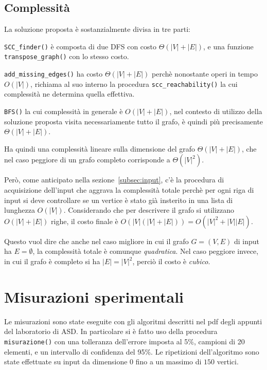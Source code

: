 \documentclass[a4paper,8pt]{article}
\theoremstyle{definition}
\theoremstyle{remark}
\begin{document}
\subsection{Complessità}
\label{subsec:complessita}
La soluzione proposta è sostanzialmente divisa in tre parti:

\medskip
\verb!SCC_finder()! è composta di due DFS con costo $\Theta(|V|+|E|)$, e una
funzione \verb!transpose_graph()! con lo stesso costo.

\smallskip
\verb!add_missing_edges()! ha costo $\Theta(|V|+|E|)$ perchè nonostante operi
in tempo $O(|V|)$, richiama al suo interno la procedura \verb!scc_reachability()!
la cui complessità ne determina quella effettiva.

\smallskip
\verb!BFS()! la cui complessità in generale è $O(|V|+|E|)$, nel contesto di
utilizzo della soluzione proposta visita necessariamente tutto il grafo, è quindi
più precisamente $\Theta(|V|+|E|)$.

\medskip
Ha quindi una complessità lineare sulla dimensione del grafo $\Theta(|V|+|E|)$,
che nel caso peggiore di un grafo completo corrisponde a $\Theta(|V|^{2})$.

Però, come anticipato nella sezione~\ref{subsec:input}, c'è la procedura di acquisizione
dell'input che aggrava la complessità totale perchè per ogni riga di input si deve
controllare se un vertice è stato già insterito in una lista di lunghezza $O(|V|)$.
Considerando che per descrivere il grafo si utilizzano $O(|V|+|E|)$ righe, il costo
finale è $O(|V|(|V|+|E|)) = O(|V|^{2}+|V||E|)$.

Questo vuol dire che anche nel caso migliore
in cui il grafo $G=(V,E)$ di input ha $E=\emptyset$, la complessità totale è comunque
\emph{quadratica}. Nel caso peggiore invece, in cui il grafo è completo si ha $|E|=|V|^{2}$,
perciò il costo è \emph{cubico}.

\section{Misurazioni sperimentali}
\label{sec:misurazioni}
Le misurazioni sono state eseguite con gli algoritmi descritti nel pdf degli appunti
del laboratorio di ASD\@. In particolare si è fatto uso della procedura \verb!misurazione()!
con una tolleranza dell'errore imposta al 5\%, campioni di 20 elementi, e un intervallo
di confidenza del 95\%. Le ripetizioni dell'algoritmo sono state effettuate su input
da dimensione $0$ fino a un massimo di $150$ vertici.
\end{document}
